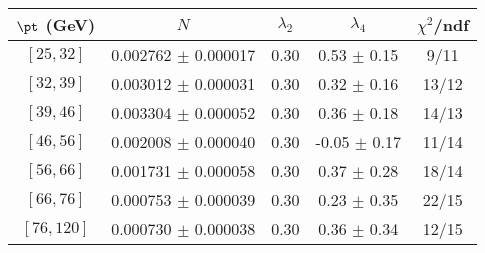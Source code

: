 \begin{tabular}{c||c|c|c|c}
$\pt$ (GeV) & $N$ & $\lambda_{2}$ & $\lambda_4$  & $\chi^2$/ndf  \\
\hline
$[25, 32]$ & 0.002762 $\pm$ 0.000017 & 0.30 & 0.53 $\pm$ 0.15 & 9/11\\
$[32, 39]$ & 0.003012 $\pm$ 0.000031 & 0.30 & 0.32 $\pm$ 0.16 & 13/12\\
$[39, 46]$ & 0.003304 $\pm$ 0.000052 & 0.30 & 0.36 $\pm$ 0.18 & 14/13\\
$[46, 56]$ & 0.002008 $\pm$ 0.000040 & 0.30 & -0.05 $\pm$ 0.17 & 11/14\\
$[56, 66]$ & 0.001731 $\pm$ 0.000058 & 0.30 & 0.37 $\pm$ 0.28 & 18/14\\
$[66, 76]$ & 0.000753 $\pm$ 0.000039 & 0.30 & 0.23 $\pm$ 0.35 & 22/15\\
$[76, 120]$ & 0.000730 $\pm$ 0.000038 & 0.30 & 0.36 $\pm$ 0.34 & 12/15\\
\end{tabular}
